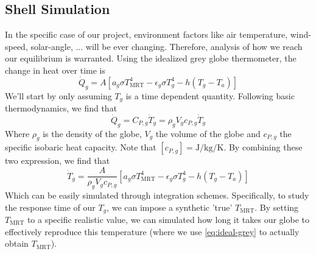 \documentclass[]{scrartcl}
\begin{document}
\subsection{Shell Simulation}
In the specific case of our project, environment factors like air temperature, wind-speed, solar-angle, ... will be ever changing. Therefore, analysis of how we reach our equilibrium is warranted. Using the idealized grey globe thermometer, the change in heat over time is 
$$
\dot{Q}_g = A\left[a_g\sigma T^4_{\text{MRT}} - \epsilon_g\sigma T^4_g - h\left(T_g - T_a\right)\right]
$$ 
We'll start by only assuming $T_g$ is a time dependent quantity. Following basic thermodynamics, we find that
$$
\dot{Q}_g = C_{P,g} \dot{T}_g = \rho_gV_gc_{P,g} \dot{T}_g 
$$
Where $\rho_g$ is the density of the globe, $V_g$ the volume of the globe and $c_{P,g}$ the specific isobaric heat capacity. Note that $\left[c_{P,g}\right] = \unit{\joule\per\kg\per\kelvin}$. By combining these two expression, we find that
$$
\dot{T}_g = \frac{A}{\rho_gV_gc_{P,g}}\left[a_g\sigma T^4_{\text{MRT}} - \epsilon_g\sigma T^4_g - h\left(T_g - T_a\right)\right]
$$
Which can be easily simulated through integration schemes. Specifically, to study the response time of our $T_g$, we can impose a synthetic 'true' $T_{\text{MRT}}$. By setting $T_{\text{MRT}}$ to a specific realistic value, we can simulated how long it takes our globe to effectively reproduce this temperature (where we use \eqref{eq:ideal-grey} to actually obtain $T_{\text{MRT}}$).
\\
\end{document}
